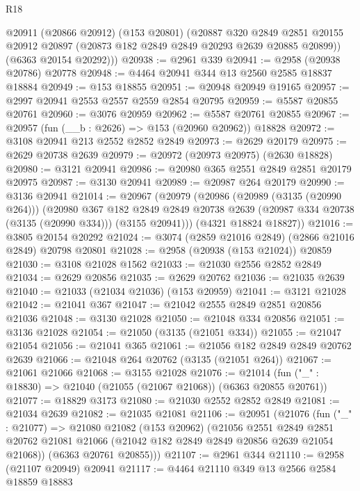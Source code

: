 \begin{lexlean}{R18}
\begin{coremodule}
      @20911
        (@20866 @20912)
        (@153 @20801)
        (@20887
          @320
          @2849
          @2851
          @20155
          @20912
          @20897
          (@20873 @182 @2849 @2849 @20293 @2639 @20885 @20899))
        (@6363 @20154 @20292)))
@20938 := @2961 @339
@20941 := @2958 (@20938 @20786) @20778
@20948 := @4464 @20941 @344 @13 @2560 @2585 @18837 @18884
@20949 := @153 @18855
@20951 := @20948 @20949 @19165
@20957 := @2997 @20941 @2553 @2557 @2559 @2854 @20795
@20959 := @5587 @20855 @20761
@20960 := @3076 @20959
@20962 := @5587 @20761 @20855
@20967 := @20957 (fun (__b : @2626) => @153 (@20960 @20962)) @18828
@20972 := @3108 @20941 @213 @2552 @2852 @2849
@20973 := @2629 @20179
@20975 := @2629 @20738 @2639
@20979 := @20972 (@20973 @20975) (@2630 @18828)
@20980 := @3121 @20941
@20986 := @20980 @365 @2551 @2849 @2851 @20179 @20975
@20987 := @3130 @20941
@20989 := @20987 @264 @20179
@20990 := @3136 @20941
@21014 := @20967
    (@20979
      (@20986
        (@20989 (@3135 (@20990 @264)))
        (@20980
          @367
          @182
          @2849
          @2849
          @20738
          @2639
          (@20987 @334 @20738 (@3135 (@20990 @334)))
          (@3155 @20941)))
      (@4321 @18824 @18827))
@21016 := @3805 @20154 @20292
@21024 := @3074 (@2859 @21016 @2849) (@2866 @21016 @2849) @20798 @20801
@21028 := @2958 (@20938 (@153 @21024)) @20859
@21030 := @3108 @21028 @1562
@21033 := @21030 @2556 @2852 @2849
@21034 := @2629 @20856
@21035 := @2629 @20762
@21036 := @21035 @2639
@21040 := @21033 (@21034 @21036) (@153 @20959)
@21041 := @3121 @21028
@21042 := @21041 @367
@21047 := @21042 @2555 @2849 @2851 @20856 @21036
@21048 := @3130 @21028
@21050 := @21048 @334 @20856
@21051 := @3136 @21028
@21054 := @21050 (@3135 (@21051 @334))
@21055 := @21047 @21054
@21056 := @21041 @365
@21061 := @21056 @182 @2849 @2849 @20762 @2639
@21066 := @21048 @264 @20762 (@3135 (@21051 @264))
@21067 := @21061 @21066
@21068 := @3155 @21028
@21076 := @21014 (fun ("_" : @18830) => @21040 (@21055 (@21067 @21068)) (@6363 @20855 @20761))
@21077 := @18829 @3173
@21080 := @21030 @2552 @2852 @2849
@21081 := @21034 @2639
@21082 := @21035 @21081
@21106 := @20951
    (@21076
      (fun ("_" : @21077) =>
      @21080
        @21082
        (@153 @20962)
        (@21056
          @2551
          @2849
          @2851
          @20762
          @21081
          @21066
          (@21042 @182 @2849 @2849 @20856 @2639 @21054 @21068))
        (@6363 @20761 @20855)))
@21107 := @2961 @344
@21110 := @2958 (@21107 @20949) @20941
@21117 := @4464 @21110 @349 @13 @2566 @2584 @18859 @18883

\end{coremodule}
\end{lexlean}
